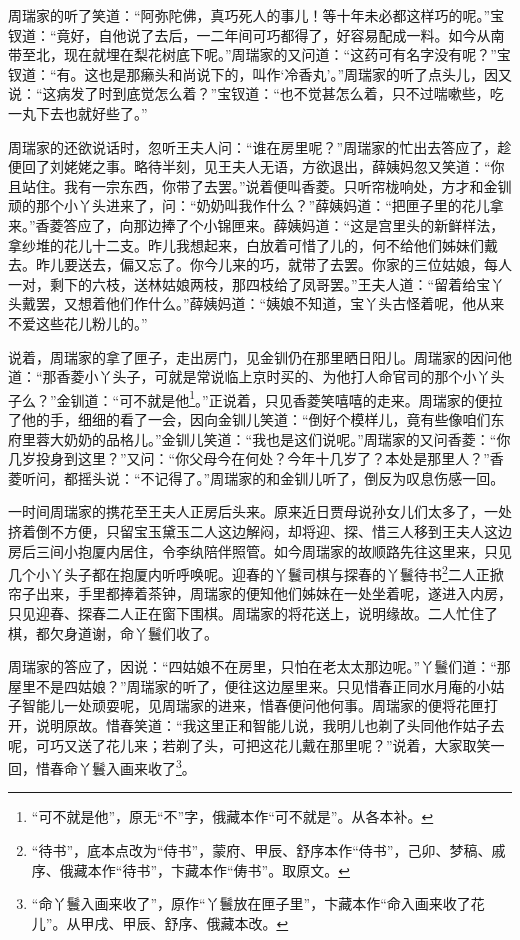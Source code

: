 \par 周瑞家的听了笑道：“阿弥陀佛，真巧死人的事儿！等十年未必都这样巧的呢。”宝钗道：“竟好，自他说了去后，一二年间可巧都得了，好容易配成一料。如今从南带至北，现在就埋在梨花树底下呢。”周瑞家的又问道：“这药可有名字没有呢？”宝钗道：“有。这也是那癞头和尚说下的，叫作‘冷香丸’。”周瑞家的听了点头儿，因又说：“这病发了时到底觉怎么着？”宝钗道：“也不觉甚怎么着，只不过喘嗽些，吃一丸下去也就好些了。”
\par 周瑞家的还欲说话时，忽听王夫人问：“谁在房里呢？”周瑞家的忙出去答应了，趁便回了刘姥姥之事。略待半刻，见王夫人无语，方欲退出，薛姨妈忽又笑道：“你且站住。我有一宗东西，你带了去罢。”说着便叫香菱。只听帘栊响处，方才和金钏顽的那个小丫头进来了，问：“奶奶叫我作什么？”薛姨妈道：“把匣子里的花儿拿来。”香菱答应了，向那边捧了个小锦匣来。薛姨妈道：“这是宫里头的新鲜样法，拿纱堆的花儿十二支。昨儿我想起来，白放着可惜了儿的，何不给他们姊妹们戴去。昨儿要送去，偏又忘了。你今儿来的巧，就带了去罢。你家的三位姑娘，每人一对，剩下的六枝，送林姑娘两枝，那四枝给了凤哥罢。”王夫人道：“留着给宝丫头戴罢，又想着他们作什么。”薛姨妈道：“姨娘不知道，宝丫头古怪着呢，他从来不爱这些花儿粉儿的。”
\par 说着，周瑞家的拿了匣子，走出房门，见金钏仍在那里晒日阳儿。周瑞家的因问他道：“那香菱小丫头子，可就是常说临上京时买的、为他打人命官司的那个小丫头子么？”金钏道：“可不就是他\footnote{“可不就是他”，原无“不”字，俄藏本作“可不就是”。从各本补。}。”正说着，只见香菱笑嘻嘻的走来。周瑞家的便拉了他的手，细细的看了一会，因向金钏儿笑道：“倒好个模样儿，竟有些像咱们东府里蓉大奶奶的品格儿。”金钏儿笑道：“我也是这们说呢。”周瑞家的又问香菱：“你几岁投身到这里？”又问：“你父母今在何处？今年十几岁了？本处是那里人？”香菱听问，都摇头说：“不记得了。”周瑞家的和金钏儿听了，倒反为叹息伤感一回。
\par 一时间周瑞家的携花至王夫人正房后头来。原来近日贾母说孙女儿们太多了，一处挤着倒不方便，只留宝玉黛玉二人这边解闷，却将迎、探、惜三人移到王夫人这边房后三间小抱厦内居住，令李纨陪伴照管。如今周瑞家的故顺路先往这里来，只见几个小丫头子都在抱厦内听呼唤呢。迎春的丫鬟司棋与探春的丫鬟待书\footnote{“待书”，底本点改为“侍书”，蒙府、甲辰、舒序本作“侍书”，己卯、梦稿、戚序、俄藏本作“待书”，卞藏本作“俦书”。取原文。}二人正掀帘子出来，手里都捧着茶钟，周瑞家的便知他们姊妹在一处坐着呢，遂进入内房，只见迎春、探春二人正在窗下围棋。周瑞家的将花送上，说明缘故。二人忙住了棋，都欠身道谢，命丫鬟们收了。
\par 周瑞家的答应了，因说：“四姑娘不在房里，只怕在老太太那边呢。”丫鬟们道：“那屋里不是四姑娘？”周瑞家的听了，便往这边屋里来。只见惜春正同水月庵的小姑子智能儿一处顽耍呢，见周瑞家的进来，惜春便问他何事。周瑞家的便将花匣打开，说明原故。惜春笑道：“我这里正和智能儿说，我明儿也剃了头同他作姑子去呢，可巧又送了花儿来；若剃了头，可把这花儿戴在那里呢？”说着，大家取笑一回，惜春命丫鬟入画来收了\footnote{“命丫鬟入画来收了”，原作“丫鬟放在匣子里”，卞藏本作“命入画来收了花儿”。从甲戌、甲辰、舒序、俄藏本改。}。
